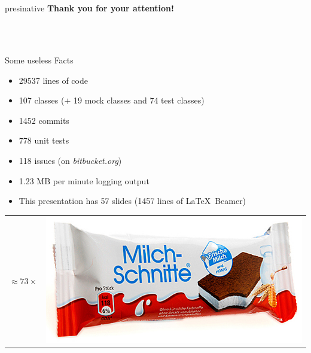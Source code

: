\documentclass[hyperref={pdfpagelabels=false},compress]{beamer}
\begin{document}
\section{}
\begin{frame}
	\hfill
	\begin{beamercolorbox}[shadow=true, rounded=true, wd=10cm]{presinative}
		\centering
		\Large{\textbf{Thank you for your attention!}}
	\end{beamercolorbox}
	\hfill \\
	\hfill \\
	\begin{block}{Some useless Facts}
		\begin{itemize}
			\item 29537 lines of code					%
			\item 107 classes ($+$ 19 mock classes and 74 test classes)	%
			\item 1452 commits						%
			\item 778 unit tests
			\item 118 issues (on \textit{bitbucket.org})
			\item 1.23 MB per minute logging output
			\item This presentation has 57 slides (1457 lines of \LaTeX\ Beamer)
		\end{itemize}
	\end{block}
	
	\begin{center}
		\begin{tabularx}{4.5cm}{m{1.5cm}m{1.5cm}}
			$\approx 73 \times$ & \includegraphics[scale=0.07]{milchschnitte.png}
		\end{tabularx}
	\end{center}
\end{frame}
\end{document}
